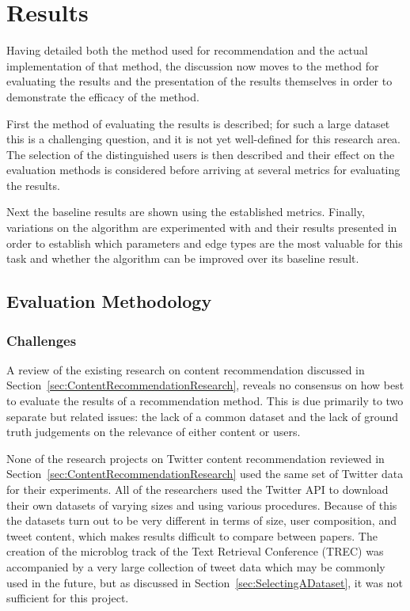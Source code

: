 \chapter{Results}

Having detailed both the method used for recommendation and the actual implementation of that method, the discussion now moves to the method for evaluating the results and the presentation of the results themselves in order to demonstrate the efficacy of the method.

First the method of evaluating the results is described; for such a large dataset this is a challenging question, and it is not yet well-defined for this research area. The selection of the distinguished users is then described and their effect on the evaluation methods is considered before arriving at several metrics for evaluating the results.

Next the baseline results are shown using the established metrics. Finally, variations on the algorithm are experimented with and their results presented in order to establish which parameters and edge types are the most valuable for this task and whether the algorithm can be improved over its baseline result.


\section{Evaluation Methodology}

\subsection{Challenges}

A review of the existing research on content recommendation discussed in Section~\ref{sec:ContentRecommendationResearch}, reveals no consensus on how best to evaluate the results of a recommendation method. This is due primarily to two separate but related issues: the lack of a common dataset and the lack of ground truth judgements on the relevance of either content or users.

None of the research projects on Twitter content recommendation reviewed in Section~\ref{sec:ContentRecommendationResearch} used the same set of Twitter data for their experiments. All of the researchers used the Twitter API to download their own datasets of varying sizes and using various procedures. Because of this the datasets turn out to be very different in terms of size, user composition, and tweet content, which makes results difficult to compare between papers. The creation of the microblog track of the Text Retrieval Conference (TREC) was accompanied by a very large collection of tweet data which may be commonly used in the future, but as discussed in Section~\ref{sec:SelectingADataset}, it was not sufficient for this project.


